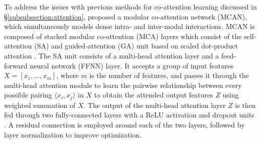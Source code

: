 \documentclass{article}
\begin{document}

To address the issues with previous methods for co-attention learning discussed in \S \ref{subsubsection:attention}, \citet{yu2019mcan} proposed a modular co-attention network (MCAN), which simultaneously models dense intra- and inter-modal interactions. MCAN is composed of stacked modular co-attention (MCA) layers which consist of the self-attention (SA) and guided-attention (GA) unit based on scaled dot-product attention \citep{transformers}. The SA unit consists of a multi-head attention layer and a feed-forward neural network (FFNN) layer. It accepts a group of input features $X = [x_{1}, \dots, x_{m}]$, where $m$ is the number of features, and passes it through the multi-head attention module to learn the pairwise relationship between every possible pairing $\langle x_{i},x_{j} \rangle$ in $X$ to obtain the attended output features $Z$ using weighted summation of $X$. The output of the multi-head attention layer $Z$ is then fed through two fully-connected layers with a ReLU activation \citep{relu} and dropout units \citep{dropout}. A residual connection \citep{residual} is employed around each of the two layers, followed by layer normalization \citep{ba2016layer} to improve optimization.
\end{document}
